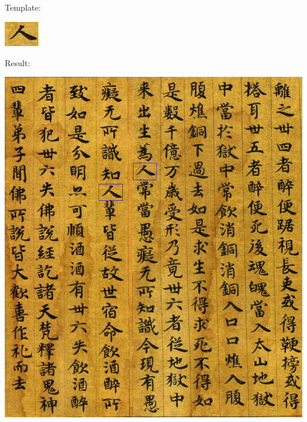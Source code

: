 \documentclass[a4paper,11pt]{article}
\begin{document}
\subsection{}
Template:
\begin{center}
\includegraphics[width=.2\textwidth]{test1}
\end{center}
Result:
\begin{center}
\includegraphics[width=.8\textwidth]{result1}
\end{center}

\clearpage
\end{document}
